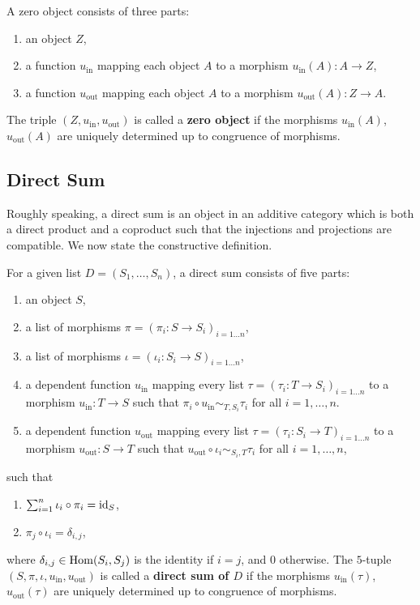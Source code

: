 \begin{definition}
  A zero object consists of three parts:
  \begin{enumerate}
   \item an object $Z$,
   \item a function $u_{\mathrm{in}}$ mapping each object $A$ to a morphism $u_{\mathrm{in}}(A): A \rightarrow Z$,
   \item a function $u_{\mathrm{out}}$ mapping each object $A$ to a morphism $u_{\mathrm{out}}(A): Z \rightarrow A$.
  \end{enumerate}
  The triple $(Z, u_{\mathrm{in}}, u_{\mathrm{out}})$ is called a \textbf{zero object} if the morphisms 
  $u_{\mathrm{in}}(A)$, $u_{\mathrm{out}}(A)$ are uniquely determined up to congruence of morphisms.
\end{definition}


\subsection{Direct Sum}

Roughly speaking, a direct sum is an object in an additive category which is both a direct product and
a coproduct such that the injections and projections are compatible.
We now state the constructive definition.

\begin{definition}\label{definition:direct_sum}
 For a given list $D = (S_1, \dots, S_n)$, a direct sum consists of five parts:
 \begin{enumerate}
  \item an object $S$,
  \item a list of morphisms $\pi = (\pi_i: S \rightarrow S_i)_{i = 1 \dots n}$,
  \item a list of morphisms $\iota = (\iota_i: S_i \rightarrow S)_{i = 1 \dots n}$,
  \item a dependent function $u_{\mathrm{in}}$ mapping every list $\tau = ( \tau_i: T \rightarrow S_i )_{i = 1 \dots n}$
        to a morphism $u_{\mathrm{in}}: T \rightarrow S$ such that
        $\pi_i \circ u_{\mathrm{in}} \sim_{T,S_i} \tau_i$ for all $i = 1, \dots, n$.
  \item a dependent function $u_{\mathrm{out}}$ mapping every list $\tau = ( \tau_i: S_i \rightarrow T )_{i = 1 \dots n}$
        to a morphism $u_{\mathrm{out}}: S \rightarrow T$ such that
        $u_{\mathrm{out}} \circ \iota_i \sim_{S_i, T} \tau_i$ for all $i = 1, \dots, n$,
 \end{enumerate}
 such that
 \begin{enumerate}
  \item $\sum_{i=1}^{n} \iota_i \circ \pi_i = \mathrm{id}_S$,
  \item $\pi_j \circ \iota_i = \delta_{i,j}$,
 \end{enumerate}
  where $\delta_{i,j} \in \operatorname{\mathrm{Hom}}( S_i, S_j )$ is the identity if $i=j$, and $0$ otherwise.
  The $5$-tuple $(S, \pi, \iota, u_{\mathrm{in}}, u_{\mathrm{out}})$ is called a \textbf{direct sum of $D$}
  if the morphisms 
  $u_{\mathrm{in}}(\tau)$, $u_{\mathrm{out}}(\tau)$ are uniquely determined up to congruence of morphisms.
\end{definition}


